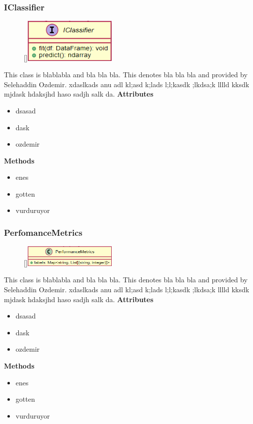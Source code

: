 \subsubsection{IClassifier}
\begin{figure}
    \raisebox{0pt}[\dimexpr{}\baselineskip\relax]{\includegraphics[width=4.5cm]{classes/model-management/11.png}}
\end{figure} 
\par
This class is blablabla and bla bla bla. This denotes bla bla bla and provided by Selehaddin Ozdemir. xdaslkads anu adl kl;asd k;lads l;l;kasdk ;lkdsa;k lllld kksdk mjdask hdaksjhd haso sadjh salk da.
\newline
\newline
\textbf{Attributes}
\begin{itemize}
    \item dsasad
    \item dask
    \item ozdemir
\end{itemize}
\textbf{Methods}
\begin{itemize}
    \item enes
    \item gotten
    \item vurduruyor
\end{itemize}

\subsubsection{PerfomanceMetrics}
\begin{figure}
    \raisebox{0pt}[\dimexpr{}\baselineskip\relax]{\includegraphics[width=4.5cm]{classes/model-management/12.png}}
\end{figure} 
\par
This class is blablabla and bla bla bla. This denotes bla bla bla and provided by Selehaddin Ozdemir. xdaslkads anu adl kl;asd k;lads l;l;kasdk ;lkdsa;k lllld kksdk mjdask hdaksjhd haso sadjh salk da.
\newline
\newline
\textbf{Attributes}
\begin{itemize}
    \item dsasad
    \item dask
    \item ozdemir
\end{itemize}
\textbf{Methods}
\begin{itemize}
    \item enes
    \item gotten
    \item vurduruyor
\end{itemize}

